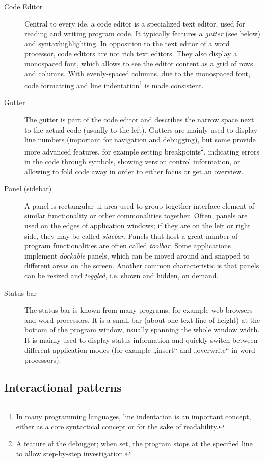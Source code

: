 \begin{description}
\item[Code Editor]
Central to every \gls{ide}, a code editor is a specialized text editor,
used for reading and writing program code. It typically features a
\emph{gutter} (see below) and \gls{syntaxhighlighting}. In opposition to
the text editor of a word processor, code editors are not rich text
editors. They also display a monospaced font, which allows to see the
editor content as a grid of rows and columns. With evenly-spaced
columns, due to the monospaced font, code formatting and line
indentation\footnote{In many programming languages, line indentation is an important concept, either as a core syntactical concept or for the sake of readability.}
is made consistent.
\item[Gutter]
The gutter is part of the code editor and describes the narrow space
next to the actual code (usually to the left). Gutters are mainly used
to display line numbers (important for navigation and debugging), but
some provide more advanced features, for example setting
breakpoints\footnote{A feature of the debugger; when set, the program stops at the specified line to allow step-by-step investigation.},
indicating errors in the code through symbols, showing version control
information, or allowing to fold code away in order to either focus or
get an overview.
\item[Panel (sidebar)]
A panel is rectangular \ac{ui} area used to group together interface
element of similar functionality or other commonalities together. Often,
panels are used on the edges of application windows; if they are on the
left or right side, they may be called \emph{sidebar}. Panels that host
a great number of program functionalities are often called
\emph{toolbar}. Some applications implement \emph{dockable} panels,
which can be moved around and snapped to different areas on the screen.
Another common characteristic is that panels can be resized and
\emph{toggled}, i.e. shown and hidden, on demand.
\item[Status bar]
The status bar is known from many programs, for example web browsers and
word processors. It is a small bar (about one text line of height) at
the bottom of the program window, usually spanning the whole window
width. It is mainly used to display status information and quickly
switch between different application modes (for example „insert“ and
„overwrite“ in word processors).
\end{description}

\subsection{Interactional patterns}\label{interactional-patterns}

